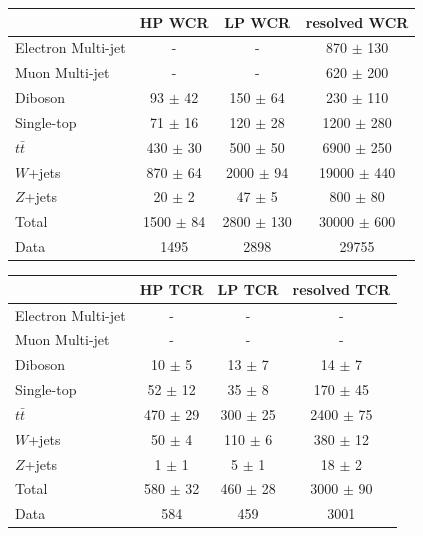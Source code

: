 \begin{table}

\begin{tabular}{|l|c|c|c|}
\hline
	  &	 HP WCR &	 LP WCR &	resolved WCR \\\hline 
	Electron Multi-jet &	- &	- &	870 $\pm$ 130\\\hline 
	Muon Multi-jet &	- &	- &	620 $\pm$ 200 \\\hline 
	Diboson &	93 $\pm$ 42&	150 $\pm$ 64 &	230 $\pm$ 110 \\\hline 
	Single-top &	71 $\pm$ 16 &	120 $\pm$ 28 &	1200 $\pm$ 280 \\\hline 
	$t\bar{t}$ &	430 $\pm$ 30 &	500 $\pm$ 50 &	6900 $\pm$ 250 \\\hline 
	$W$+jets &	870 $\pm$ 64 &	2000 $\pm$ 94 &	19000 $\pm$ 440 \\\hline 
	$Z$+jets &	20 $\pm$ 2 &	47 $\pm$ 5 &	800 $\pm$ 80 \\\hline 
	Total &	1500 $\pm$ 84 &	2800 $\pm$ 130 &	30000 $\pm$ 600 \\\hline 
	Data &	1495 &	2898 &	29755 \\\hline 
\end{tabular}

\begin{tabular}{|l|c|c|c|}
\hline
	  &	 HP TCR &	 LP TCR &	resolved TCR \\\hline 
	Electron Multi-jet &	- &	- &	- \\\hline 
	Muon Multi-jet &	- &	- &	- \\\hline 
	Diboson &	10 $\pm$ 5 &	13 $\pm$ 7 &	14 $\pm$ 7 \\\hline 
	Single-top &	52 $\pm$ 12 &	35 $\pm$ 8 &	170 $\pm$ 45 \\\hline 
	$t\bar{t}$ &	470 $\pm$ 29 &	300 $\pm$ 25 &	2400 $\pm$ 75 \\\hline 
	$W$+jets &	50 $\pm$ 4 &	110 $\pm$ 6 &	380 $\pm$ 12 \\\hline 
	$Z$+jets &	1 $\pm$ 1 &	5 $\pm$ 1 &	18 $\pm$ 2\\\hline 
	Total &	580 $\pm$ 32 &	460 $\pm$ 28 &	3000 $\pm$ 90 \\\hline 
	Data &	584 &	459 &	3001 \\\hline 
\end{tabular}


\end{table}
